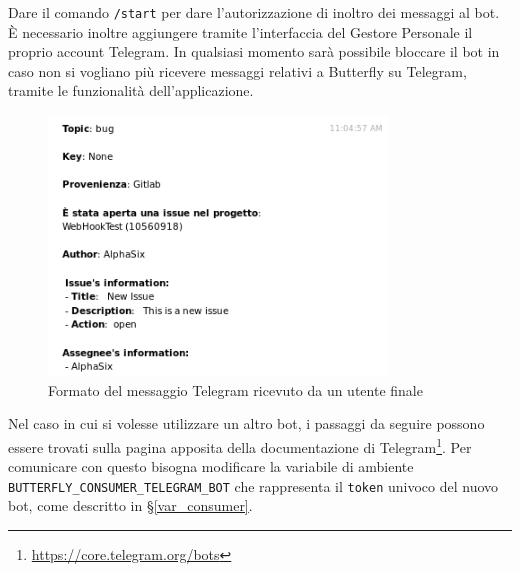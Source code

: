 Dare il comando \texttt{/start} per dare l'autorizzazione di inoltro dei messaggi al bot.
È necessario inoltre aggiungere tramite l'interfaccia del Gestore Personale il proprio account Telegram.
In qualsiasi momento sarà possibile bloccare il bot in caso non si vogliano più ricevere messaggi relativi a Butterfly su Telegram, tramite le funzionalità dell'applicazione.
\begin{figure}[H]
	\centering
	\includegraphics[width=9cm]{img/notifica_telegram_1.png}
	\caption{Formato del messaggio Telegram ricevuto da un utente finale}
\end{figure}
Nel caso in cui si volesse utilizzare un altro bot, i passaggi da seguire possono essere trovati sulla pagina apposita della documentazione di Telegram\footnote{\url{https://core.telegram.org/bots}}.
Per comunicare con questo bisogna modificare la variabile di ambiente \texttt{BUTTERFLY\_CONSUMER\_TELEGRAM\_BOT} che rappresenta il \texttt{token} univoco del nuovo bot, come descritto in \S\ref{var_consumer}.
